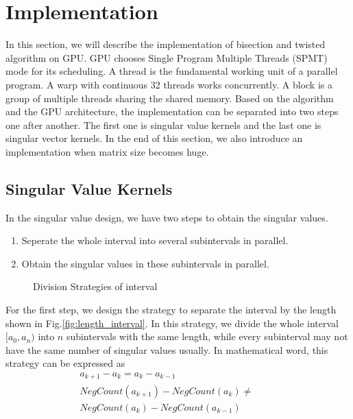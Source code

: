 \section{Implementation}
In this section, we will describe the implementation of bisection and twisted algorithm on GPU.
GPU chooses Single Program Multiple Threads (SPMT) mode for its scheduling. 
A thread is the fundamental working unit of a parallel program.
A warp with continuous 32 threads works concurrently.
A block is a group of multiple threads sharing the shared memory.
Based on the algorithm and the GPU architecture, the implementation can be separated into two steps one after another.
The first one is singular value kernels and the last one is singular vector kernels.
In the end of this section, we also introduce an implementation when matrix size becomes huge.

\subsection{Singular Value Kernels}
In the singular value design, we have two steps to obtain the singular values.
\begin{enumerate}
\item Seperate the whole interval into several subintervals in parallel.
\item Obtain the singular values in these subintervals in parallel.
\end{enumerate}

\begin{figure}[hbpt]
\centering
  \caption{Division Strategies of interval}
\end{figure}
For the first step, we design the strategy to separate the interval by the length shown in Fig.\ref{fig:length_interval}.
In this strategy, we divide the whole interval $[a_0, a_n)$ into $n$ subintervals with the same length, while every subinterval may not have the same number of singular values usually.
In mathematical word, this strategy can be expressed as%
\begin{eqnarray}
a_{k+1}-a_k = a_{k}-a_{k-1} \hspace{2cm} \\
NegCount(a_{k+1})-NegCount(a_{k}) \ne \hspace{1cm} \nonumber\\
NegCount(a_{k})-NegCount(a_{k-1})
\end{eqnarray}

